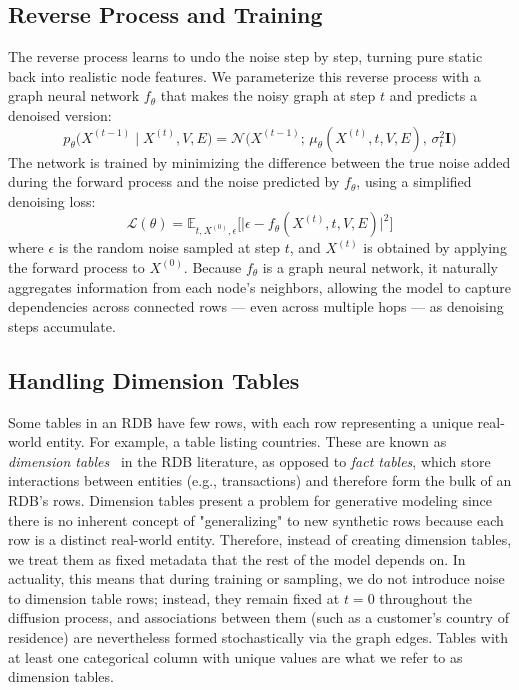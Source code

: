 \documentclass[manuscript,review]{acmart}
\begin{document}
\subsection{Reverse Process and Training}
The reverse process learns to undo the noise step by step, turning pure static back into realistic node features. We parameterize this reverse process with a graph neural network $f_\theta$ that makes the noisy graph at step $t$ and predicts a denoised version:
\begin{equation}
    p_\theta\big(X^{(t-1)} \mid X^{(t)}, V, E\big) = \mathcal{N}\!\big(X^{(t-1)};\, \mu_\theta(X^{(t)}, t, V, E), \, \sigma_t^2 \mathbf{I}\big)
    \label{eq:reverse}
\end{equation}
The network is trained by minimizing the difference between the true noise added during the forward process and the noise predicted by $f_\theta$, using a simplified denoising loss:
\begin{equation}
    \mathcal{L}(\theta) = \mathbb{E}_{t, X^{(0)}, \epsilon} \Big[ \big| \epsilon - f_\theta(X^{(t)}, t, V, E) \big|^2\Big]
    \label{eq:loss}
\end{equation}
where $\epsilon$ is the random noise sampled at step $t$, and $X^{(t)}$ is obtained by applying the forward process to $X^{(0)}$. Because $f_\theta$ is a graph neural network, it naturally aggregates information from each node's neighbors, allowing the model to capture dependencies across connected rows — even across multiple hops — as denoising steps accumulate.

\subsection{Handling Dimension Tables}
Some tables in an RDB have few rows, with each row representing a unique real-world entity. For example, a table listing countries. These are known as \emph{dimension tables}~\cite{fey2023relationaldeeplearninggraph} in the RDB literature, as opposed to \emph{fact tables}, which store interactions between entities (e.g., transactions) and therefore form the bulk of an RDB's rows.
Dimension tables present a problem for generative modeling since there is no inherent concept of "generalizing" to new synthetic rows because each row is a distinct real-world entity. Therefore, instead of creating dimension tables, we treat them as fixed metadata that the rest of the model depends on. In actuality, this means that during training or sampling, we do not introduce noise to dimension table rows; instead, they remain fixed at $t=0$ throughout the diffusion process, and associations between them (such as a customer's country of residence) are nevertheless formed stochastically via the graph edges. Tables with at least one categorical column with unique values are what we refer to as dimension tables.
\end{document}
